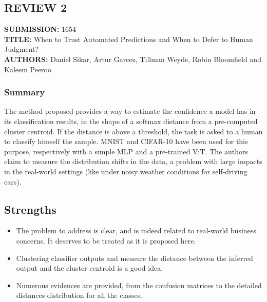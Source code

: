 \subsection*{REVIEW 2}
\textbf{SUBMISSION:} 1654\\
\textbf{TITLE:} When to Trust Automated Predictions and When to Defer to Human Judgment?\\
\textbf{AUTHORS:} Daniel Sikar, Artur Garcez, Tillman Weyde, Robin Bloomfield and Kaleem Peeroo

\subsubsection*{Summary}
The method proposed provides a way to estimate the confidence a model has in its classification results, in the shape of a softmax distance from a pre-computed cluster centroid. If the distance is above a threshold, the task is asked to a human to classify himself the sample. MNIST and CIFAR-10 have been used for this purpose, respectively with a simple MLP and a pre-trained ViT. The authors claim to measure the distribution shifts in the data, a problem with large impacts in the real-world settings (like under noisy weather conditions for self-driving cars).

\subsection*{Strengths}
\begin{itemize}
    \item The problem to address is clear, and is indeed related to real-world business concerns. It deserves to be treated as it is proposed here.
    \item Clustering classifier outputs and measure the distance between the inferred output and the cluster centroid is a good idea.
    \item Numerous evidences are provided, from the confusion matrices to the detailed distances distribution for all the classes.
\end{itemize}

